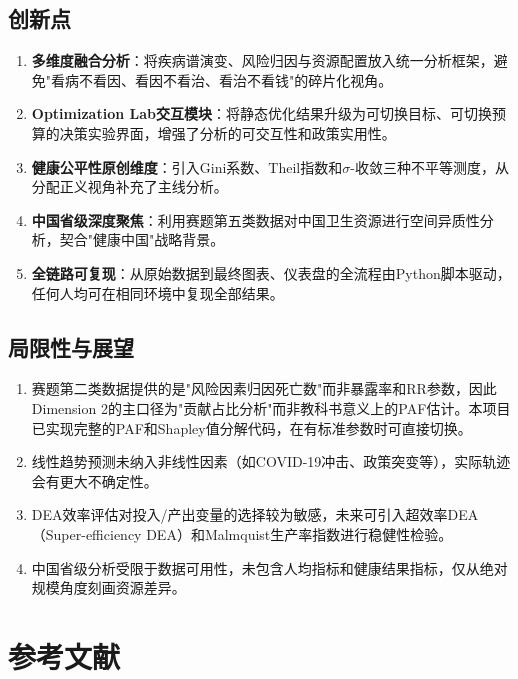 \documentclass[12pt,a4paper]{ctexart}
\begin{document}
\subsection{创新点}

\begin{enumerate}[label=\arabic*)]
    \item \textbf{多维度融合分析}：将疾病谱演变、风险归因与资源配置放入统一分析框架，避免"看病不看因、看因不看治、看治不看钱"的碎片化视角。
    \item \textbf{Optimization Lab交互模块}：将静态优化结果升级为可切换目标、可切换预算的决策实验界面，增强了分析的可交互性和政策实用性。
    \item \textbf{健康公平性原创维度}：引入Gini系数、Theil指数和$\sigma$-收敛三种不平等测度，从分配正义视角补充了主线分析。
    \item \textbf{中国省级深度聚焦}：利用赛题第五类数据对中国卫生资源进行空间异质性分析，契合"健康中国"战略背景。
    \item \textbf{全链路可复现}：从原始数据到最终图表、仪表盘的全流程由Python脚本驱动，任何人均可在相同环境中复现全部结果。
\end{enumerate}

\subsection{局限性与展望}

\begin{enumerate}[label=\arabic*)]
    \item 赛题第二类数据提供的是"风险因素归因死亡数"而非暴露率和RR参数，因此Dimension 2的主口径为"贡献占比分析"而非教科书意义上的PAF估计。本项目已实现完整的PAF和Shapley值分解代码，在有标准参数时可直接切换。
    \item 线性趋势预测未纳入非线性因素（如COVID-19冲击、政策突变等），实际轨迹会有更大不确定性。
    \item DEA效率评估对投入/产出变量的选择较为敏感，未来可引入超效率DEA（Super-efficiency DEA）和Malmquist生产率指数进行稳健性检验。
    \item 中国省级分析受限于数据可用性，未包含人均指标和健康结果指标，仅从绝对规模角度刻画资源差异。
\end{enumerate}

\section*{参考文献}
\end{document}
